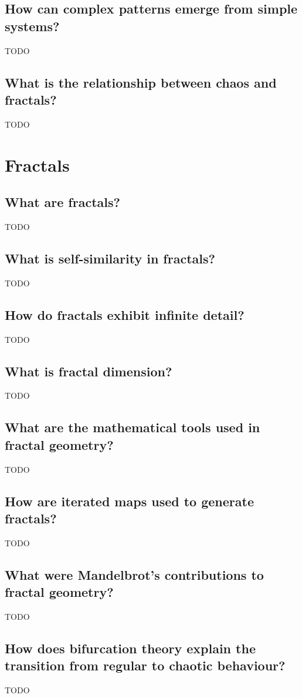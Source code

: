 \documentclass[12pt]{article}
\begin{document}
\subsection{How can complex patterns emerge from simple systems?}
TODO

\subsection{What is the relationship between chaos and fractals?}
TODO

\section{Fractals}
\subsection{What are fractals?}
TODO

\subsection{What is self-similarity in fractals?}
TODO

\subsection{How do fractals exhibit infinite detail?}
TODO

\subsection{What is fractal dimension?}
TODO

\subsection{What are the mathematical tools used in fractal geometry?}
TODO

\subsection{How are iterated maps used to generate fractals?}
TODO

\subsection{What were Mandelbrot's contributions to fractal geometry?}
TODO

\subsection{How does bifurcation theory explain the transition from regular to chaotic behaviour?}
TODO
\end{document}

